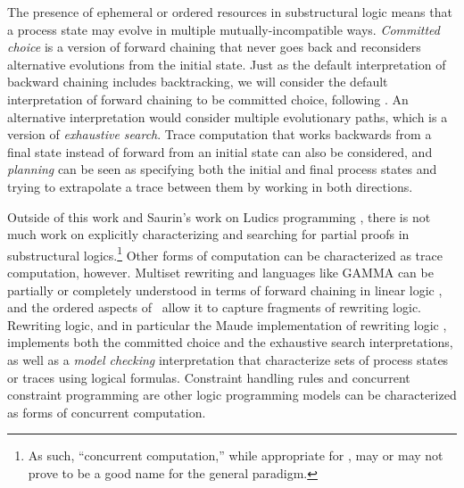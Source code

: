 The presence of ephemeral or ordered resources in substructural logic
means that a process state may evolve in multiple
mutually-incompatible ways. {\it Committed choice} is a version of
forward chaining that never goes back and reconsiders alternative
evolutions from the initial state. Just as the default interpretation
of backward chaining includes backtracking, we will consider the
default interpretation of forward chaining to be committed choice,
following \cite{lopez05monadic}.  An alternative interpretation 
would consider multiple evolutionary paths, which is
a version of {\it exhaustive search}.  Trace computation that works backwards
from a final state instead of forward from an initial state can also
be considered, and {\it planning} can be seen as specifying both the
initial and final process states and trying to extrapolate a trace
between them by working in both directions.

Outside of this work and Saurin's work on Ludics programming
\cite{saurin08towards}, there is not much work on explicitly
characterizing and searching for partial proofs in substructural
logics.\footnote{As such, ``concurrent computation,'' while
  appropriate for \sls, may or may not prove to be a good name for the
  general paradigm.}  Other forms of computation can be characterized
as trace computation, however.  Multiset rewriting and languages like
GAMMA can be partially or completely understood in terms of forward
chaining in linear logic \cite{cervesato09relating,paola96linear}, and
the ordered aspects of \sls~allow it to capture fragments of rewriting
logic. Rewriting logic, and in particular the Maude implementation of
rewriting logic \cite{clavel11ltl}, implements both the committed choice
and the exhaustive search interpretations, as well as a
{\it model checking} interpretation that characterize sets of process
states or traces using logical formulas. Constraint handling
rules \cite{betz10complete} and concurrent constraint programming
\cite{jagadeesan05testing} are other logic programming models can be 
characterized as forms of concurrent computation.





